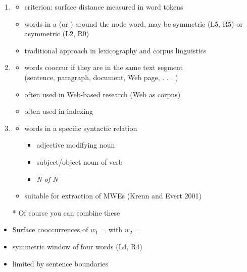 \documentclass[a4paper,landscape,headrule,footrule,xetex]{foils}
\begin{document}
\begin{enumerate}
\item  {}
  \begin{itemize}
  \item criterion: surface distance measured in word tokens
  \item words in a  (or ) around
    the node word, may be symmetric (L5, R5) or asymmetric (L2, R0)
  \item  traditional approach in lexicography and corpus linguistics
  \end{itemize}
\item {}
  \begin{itemize}
\item words cooccur if they are in the same text segment
\\ (sentence, paragraph, document, Web page, . . . )
\item often used in Web-based research (\into Web as corpus)
\item often used in indexing
\end{itemize}
\newpage
\item {}
  \begin{itemize}
  \item words in a specific syntactic relation
  \begin{itemize}
  \item adjective modifying noun
  \item subject/object noun of verb
  \item \textit{N of N} 
  \end{itemize}
\item suitable for extraction of MWEs (Krenn and Evert 2001)
\end{itemize}
\item[*] Of course you can combine these
\end{enumerate}


\begin{itemize}
  \item Surface cooccurrences of 
    $w_1$ =  with $w_2$ = 
  \item symmetric window of four words (L4, R4)
  \item  limited by sentence boundaries
  \end{itemize}
  
\end{document}
